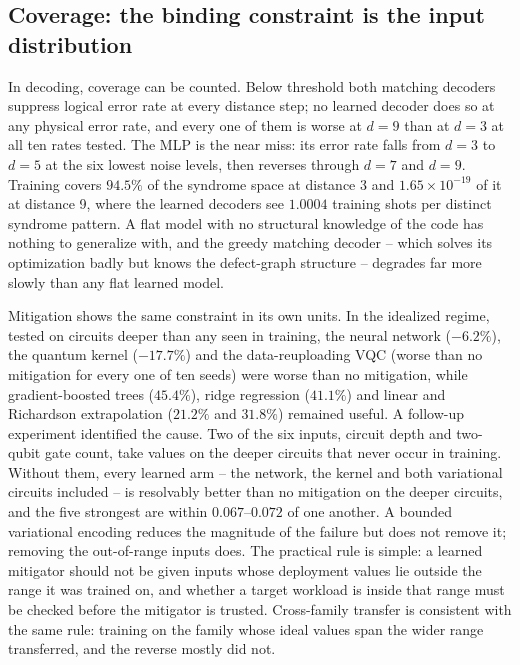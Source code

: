 \documentclass[Thesis.tex]{subfiles}
\begin{document}
\subsection{Coverage: the binding constraint is the input distribution}

In decoding, coverage can be counted. Below threshold
both matching decoders suppress logical error rate at every distance step; no
learned decoder does so at any physical error rate, and every one of them is worse at
$d = 9$ than at $d = 3$ at all ten rates tested. The MLP is the near miss: its error
rate falls from $d = 3$ to $d = 5$ at the six lowest noise levels, then reverses
through $d = 7$ and $d = 9$. Training covers $94.5\%$ of the syndrome space at
distance 3 and $1.65 \times 10^{-19}$ of it at distance 9, where the learned decoders
see $1.0004$ training shots per distinct syndrome pattern. A flat model with no
structural knowledge of the code has nothing to generalize with, and the greedy
matching decoder -- which solves its optimization badly but knows the defect-graph
structure -- degrades far more slowly than any flat learned model.

Mitigation shows the same constraint in its own units. In the idealized regime, tested on circuits deeper than any seen in training, the
neural network ($-6.2\%$), the quantum kernel ($-17.7\%$) and the data-reuploading
VQC (worse than no mitigation for every one of ten seeds) were worse than no
mitigation, while gradient-boosted trees ($45.4\%$), ridge regression ($41.1\%$) and
linear and Richardson extrapolation ($21.2\%$ and $31.8\%$) remained useful. A
follow-up experiment identified the cause. Two of the six inputs, circuit depth and
two-qubit gate count, take values on the deeper circuits that never occur in
training. Without them, every learned arm -- the network, the kernel and both
variational circuits included -- is resolvably better than no mitigation on the
deeper circuits, and the five strongest are within $0.067$--$0.072$ of one another.
A bounded variational encoding reduces the magnitude of the failure but does not
remove it; removing the out-of-range inputs does. The practical rule is simple: a
learned mitigator should not be given inputs whose deployment values lie outside the
range it was trained on, and whether a target workload is inside that range must be
checked before the mitigator is trusted. Cross-family transfer is consistent with
the same rule: training on the family whose ideal values span the wider range
transferred, and the reverse mostly did not.
\end{document}
